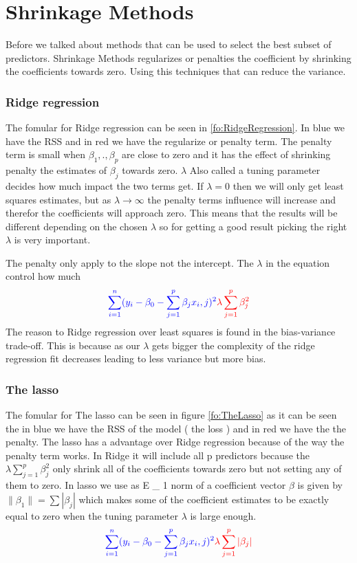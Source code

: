 \chapter{Shrinkage Methods} \label{ch:shrinkageMethods}
Before we talked about methods that can be used to select the best subset of predictors. Shrinkage Methods regularizes or penalties the coefficient by shrinking the coefficients towards zero. Using this techniques that can reduce the variance. 

\subsection{Ridge regression}

The fomular for Ridge regression can be seen in \ref{fo:RidgeRegression}. In blue we have the RSS and in red we have the regularize or penalty term. The penalty term is small when $\beta_1, . ,\beta_p$ are close to zero and it has the effect of shrinking penalty the estimates of $\beta_j$ towards zero. $\lambda$ Also called a tuning parameter decides how much impact the two terms get. If $\lambda = 0$ then we will only get least squares estimates, but as $ \lambda \to \infty$ the penalty terms influence will increase and therefor the coefficients will approach zero. This means that the results will be different depending on the chosen $\lambda$ so for getting a good result picking the right $\lambda$ is very important.

The penalty only apply to the slope not the intercept. The $\lambda$ in the equation control how much 
\begin{align}\label{fo:RidgeRegression}
\color{blue} \sum_{i=1}^{n} ( y_i - \beta_0 - \sum_{j=1}^{p} \beta_j x_i,j )^2  \color{red} \lambda \sum_{j=1}^{p} \beta^2_j 
\end{align}
The reason to Ridge regression over least squares is found in the bias-variance
trade-off. This is because as our $\lambda$ gets bigger the complexity of the ridge regression fit decreases leading to less variance but more bias.

\subsection{The lasso}
The fomular for The lasso can be seen in figure \ref{fo:TheLasso} as it can be seen the in blue we have the RSS of the model ( the loss ) and in red we have the the penalty. The lasso has a advantage over Ridge regression because of the way the penalty term works. In Ridge it will include all p predictors because the $\lambda \sum_{j=1}^{p} \beta^2_j$ only shrink all of the coefficients towards zero but not setting any of them to zero. In lasso we use as E \_ 1 norm of a coefficient vector $\beta$ is given by $ \lVert \beta_1 \rVert = \sum | \beta_j |$ which makes some of the coefficient estimates to be exactly equal to zero when the tuning parameter $ \lambda $ is large enough.
\begin{align}\label{fo:TheLasso}
\color{blue} \sum_{i=1}^{n} ( y_i - \beta_0 - \sum_{j=1}^{p} \beta_j x_i,j )^2  \color{red} \lambda \sum_{j=1}^{p} |\beta_j|
\end{align}
